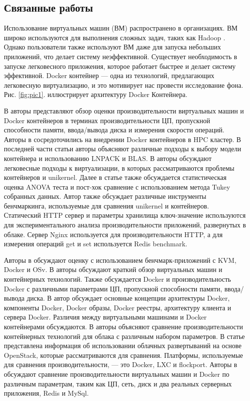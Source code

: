 \documentclass{mirea}
\begin{document}
	\subsection{Связанные работы}
	
	Использование виртуальных машин (ВМ) распространено в организациях. ВМ широко используются для выполнения сложных задач, таких как Hadoop \cite{cit2}. Однако пользователи также используют ВМ даже для запуска небольших приложений, что делает систему неэффективной. Существует необходимость в запуске легковесного приложения, которое работает быстрее и делает систему эффективной. Docker контейнер — одна из технологий, предлагающих легковесную виртуализацию, и это мотивирует нас провести исследование фона. Рис. \ref{fig:pic1}. иллюстрирует архитектуру Docker Контейнера.
	
	В \cite{cit3} авторы представляют обзор оценки производительности виртуальных машин и Docker контейнеров в терминах производительности ЦП, пропускной способности памяти, ввода/вывода диска и измерения скорости операций. Авторы в \cite{cit4} сосредоточились на внедрении Docker контейнеров в HPC кластер. В последней части статьи авторы объясняют различные подходы к выбору модели контейнера и использованию LNPACK и BLAS. В \cite{cit5} авторы обсуждают легковесные подходы к виртуализации, в которых рассматриваются проблемы контейнеров и unikernel. Далее в статье также обсуждается статистическая оценка ANOVA теста и пост-хок сравнение с использованием метода Tukey собранных данных. Автор также обсуждает различные инструменты бенчмаркинга, используемые для сравнения unikernel и контейнеров. Статический HTTP сервер и параметры хранилища ключ-значение используются для экспериментального анализа производительности приложений, развернутых в облаке. Сервер Nginx используется для производительности HTTP, а для измерения операций get и set используется Redis benchmark.
	
	Авторы в \cite{cit6} обсуждают оценку с использованием бенчмарк-приложений с KVM, Docker и OSv. В \cite{cit7} авторы обсуждают краткий обзор виртуальных машин и контейнерных технологий. Также обсуждается Docker и производительность Docker с различными параметрами ЦП, пропускной способности памяти, ввода/вывода диска. В \cite{cit8} автор обсуждает основные концепции архитектуры Docker, компоненты Docker, Docker образы, Docker реестры, архитектуру клиента и сервера Docker. Различия между виртуальными машинами и Docker контейнерами обсуждаются. В \cite{cit9} авторы объясняют сравнение производительности контейнерных технологий для облака с различным набором параметров. В статье представлена информация об использовании облачных развертываний на основе OpenStack, которые рассматриваются для сравнения. Платформы, используемые для сравнения производительности, — это Docker, LXC и flockport. Авторы в \cite{cit10} обсуждают сравнение производительности виртуальных машин и Docker по различным параметрам, таким как ЦП, сеть, диск и два реальных серверных приложения, Redis и MySql.
	
\end{document}
